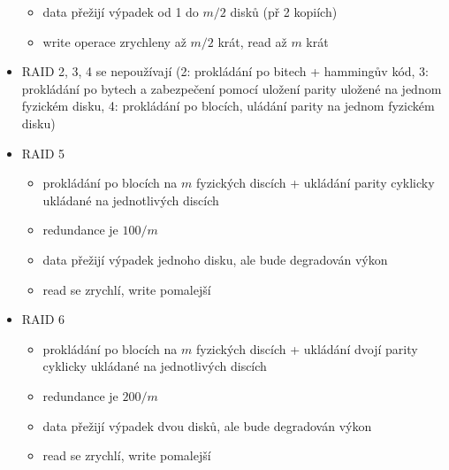 \begin{itemize}
\begin{itemize}
        \item data přežijí výpadek od 1 do $m/2$ disků (př 2 kopiích)
        \item write operace zrychleny až $m/2$ krát, read až $m$ krát
    \end{itemize}
    \item RAID 2, 3, 4 se nepoužívají (2: prokládání po bitech + hammingův kód, 3: prokládání po bytech a zabezpečení pomocí uložení parity uložené na jednom fyzickém disku, 4: prokládání po blocích, uládání parity na jednom fyzickém disku)
    \item RAID 5
    \begin{itemize}
        \item prokládání po blocích na $m$ fyzických discích + ukládání parity cyklicky ukládané na jednotlivých discích
        \item redundance je $100/m$ %
        \item data přežijí výpadek jednoho disku, ale bude degradován výkon
        \item read se zrychlí, write pomalejší
    \end{itemize}
    \item RAID 6
    \begin{itemize}
        \item prokládání po blocích na $m$ fyzických discích + ukládání dvojí parity cyklicky ukládané na jednotlivých discích
        \item redundance je $200/m$ %
        \item data přežijí výpadek dvou disků, ale bude degradován výkon
        \item read se zrychlí, write pomalejší
    \end{itemize}
\end{itemize}

